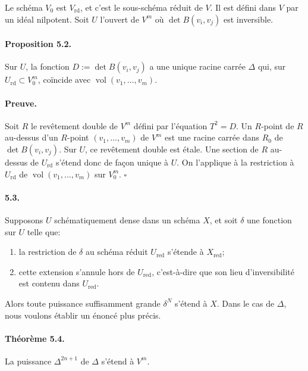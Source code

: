 \documentclass[11pt]{article}
\newcommand{\rd}{\mathrm{rd}}
\newcommand{\red}{\mathrm{red}}
\begin{document}
Le schéma $V_0$ est $V_{\rd}$, et c'est le sous-schéma réduit de $V$. Il est défini dans $V$ par un idéal nilpotent. Soit $U$ l'ouvert de $V^m$ où $\det B(v_i,v_j)$ est inversible.

\paragraph{Proposition 5.2.}
Sur $U$, la fonction $D:=\det B(v_i,v_j)$ a une unique racine carrée $\Delta$ qui, sur $U_{\rd}\subset V_0^m$, coïncide avec $\operatorname{vol}(v_1,\ldots,v_m)$.

\paragraph{Preuve.}
Soit $R$ le revêtement double de $V^m$ défini par l'équation $T^2=D$. Un $R$-point de $R$ au-dessus d'un $R$-point $(v_1,\ldots,v_m)$ de $V^m$ est une racine carrée dans $R_0$ de $\det B(v_i,v_j)$. Sur $U$, ce revêtement double est étale. Une section de $R$ au-dessus de $U_{\rd}$ s'étend donc de façon unique à $U$. On l'applique à la restriction à $U_{\rd}$ de $\operatorname{vol}(v_1,\ldots,v_m)$ sur $V_0^m$. \hfill $\square$

\paragraph{5.3.}
Supposons $U$ schématiquement dense dans un schéma $X$, et soit $\delta$ une fonction sur $U$ telle que:
\begin{enumerate}[label=(\alph*)]
\item la restriction de $\delta$ au schéma réduit $U_{\red}$ s'étende à $X_{\red}$;
\item cette extension s'annule hors de $U_{\red}$, c'est-à-dire que son lieu d'inversibilité est contenu dans $U_{\red}$.
\end{enumerate}
Alors toute puissance suffisamment grande $\delta^N$ s'étend à $X$. Dans le cas de $\Delta$, nous voulons établir un énoncé plus précis.

\paragraph{Théorème 5.4.}
La puissance $\Delta^{2n+1}$ de $\Delta$ s'étend à $V^m$.
\end{document}
